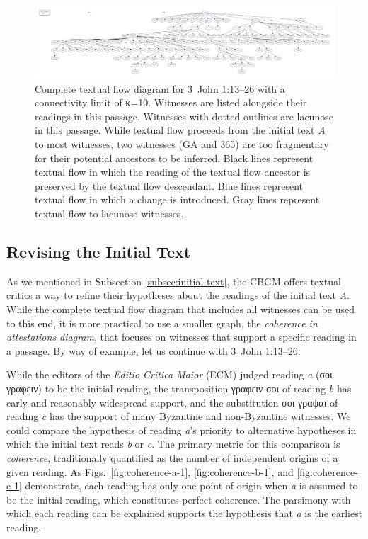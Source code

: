 \documentclass[a4paper, 12pt]{article}
\begin{document}
	\begin{figure}
		\includegraphics[width=\textwidth]{../graphics/B25K1V13U24-26-textual-flow.pdf}
		\caption{Complete textual flow diagram for 3~John 1:13–26 with a connectivity limit of κ=10. Witnesses are listed alongside their readings in this passage. Witnesses with dotted outlines are lacunose in this passage. While textual flow proceeds from the initial text \emph{A} to most witnesses, two witnesses (GA  and 365) are too fragmentary for their potential ancestors to be inferred. Black lines represent textual flow in which the reading of the textual flow ancestor is preserved by the textual flow descendant. Blue lines represent textual flow in which a change is introduced. Gray lines represent textual flow to lacunose witnesses.}
		\label{fig:textual-flow}
	\end{figure}
	
	\newpage
	
	\subsection{Revising the Initial Text}\label{subsec:revising-initial-text}
	As we mentioned in Subsection \ref{subsec:initial-text}, the CBGM offers textual critics a way to refine their hypotheses about the readings of the initial text \emph{A}. While the complete textual flow diagram that includes all witnesses can be used to this end, it is more practical to use a smaller graph, the \emph{coherence in attestations diagram}, that focuses on witnesses that support a specific reading in a passage. By way of example, let us continue with 3~John 1:13–26.
	
	While the editors of the \emph{Editio Critica Maior} (ECM) judged reading \emph{a} (σοι γραφειν) to be the initial reading, the transposition γραφειν σοι of reading \emph{b} has early and reasonably widespread support, and the substitution σοι γραψαι of reading \emph{c} has the support of many Byzantine and non-Byzantine witnesses. We could compare the hypothesis of reading \emph{a}'s priority to alternative hypotheses in which the initial text reads \emph{b} or \emph{c}. The primary metric for this comparison is \emph{coherence}, traditionally quantified as the number of independent origins of a given reading. As Figs.~\ref{fig:coherence-a-1}, \ref{fig:coherence-b-1}, and \ref{fig:coherence-c-1} demonstrate, each reading has only one point of origin when \emph{a} is assumed to be the initial reading, which constitutes perfect coherence. The parsimony with which each reading can be explained supports the hypothesis that \emph{a} is the earliest reading.
	
\end{document}
